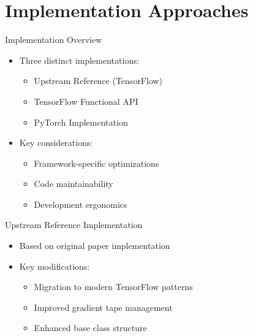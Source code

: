 \documentclass{beamer}
\begin{document}
\section{Implementation Approaches}
\begin{frame}{Implementation Overview}
    \begin{itemize}
        \item Three distinct implementations:
        \begin{itemize}
            \item Upstream Reference (TensorFlow)
            \item TensorFlow Functional API
            \item PyTorch Implementation
        \end{itemize}
        \item Key considerations:
        \begin{itemize}
            \item Framework-specific optimizations
            \item Code maintainability
            \item Development ergonomics
        \end{itemize}
    \end{itemize}
\end{frame}

\begin{frame}{Upstream Reference Implementation}
    \begin{itemize}
        \item Based on original paper implementation
        \item Key modifications:
        \begin{itemize}
            \item Migration to modern TensorFlow patterns
            \item Improved gradient tape management
            \item Enhanced base class structure
        \end{itemize}
    \end{itemize}
\end{frame}
\end{document}
